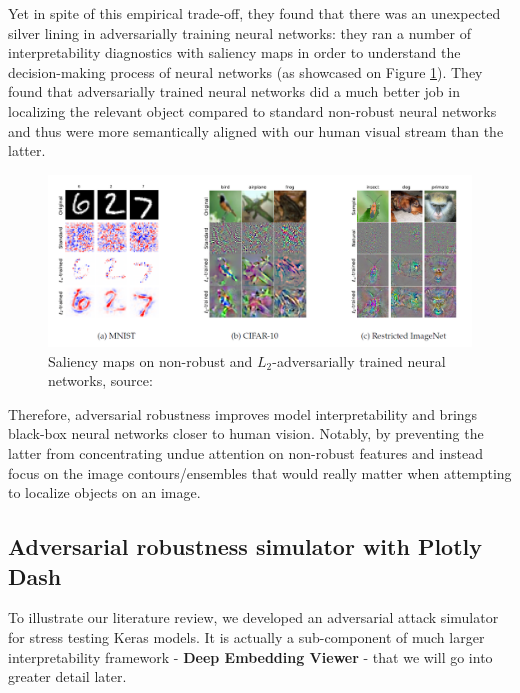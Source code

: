 \vspace{0.2cm}

Yet in spite of this empirical trade-off, they found that there was an unexpected silver lining in adversarially training neural networks: they ran a number of interpretability diagnostics with saliency maps in order to understand the decision-making process of neural networks (as showcased on Figure \ref{fig:Adv_006_Fig}). They found that adversarially trained neural networks did a much better job in localizing the relevant object compared to standard non-robust neural networks and thus were more semantically aligned with our human visual stream than the latter.


\vspace{0.2cm}

\begin{figure}[H]
	\centering
	\includegraphics[scale=0.6]{images/adversarial_attacks/Adv_Fig_006_Robustness_2.PNG}
	\caption{Saliency maps on non-robust and $L_2$-adversarially trained neural networks, source: \cite{tsipras2018robustness}}
	\label{fig:Adv_006_Fig}
\end{figure}

\vspace{0.2cm}

Therefore, adversarial robustness improves model interpretability and brings black-box neural networks closer to human vision. Notably, by preventing the latter from concentrating undue attention on non-robust features and instead focus on the image contours/ensembles that would really matter when attempting to localize objects on an image.

\subsection{Adversarial robustness simulator with Plotly Dash}

To illustrate our literature review, we developed an adversarial attack simulator for stress testing Keras models. It is actually a sub-component of much larger interpretability framework - \textbf{Deep Embedding Viewer} - that we will go into greater detail later.

